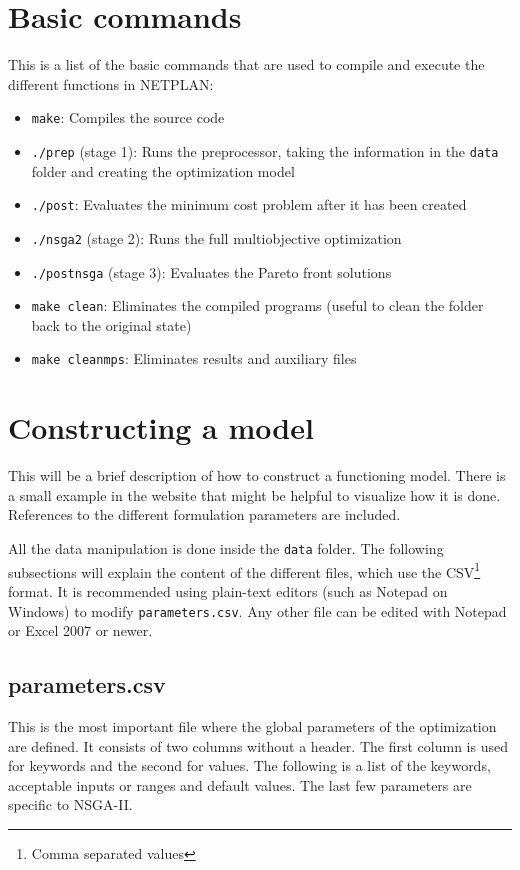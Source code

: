 \documentclass{article}
\begin{document}
\section{Basic commands}

This is a list of the basic commands that are used to compile and execute the different functions in NETPLAN:

\begin{itemize}
  \item \verb=make=: Compiles the source code
  \item \verb=./prep= (stage 1): Runs the preprocessor, taking the information in the \verb=data= folder and creating the optimization model
  \item \verb=./post=: Evaluates the minimum cost problem after it has been created
  \item \verb=./nsga2= (stage 2): Runs the full multiobjective optimization
  \item \verb=./postnsga= (stage 3): Evaluates the Pareto front solutions
  \item \verb=make clean=: Eliminates the compiled programs (useful to clean the folder back to the original state)
  \item \verb=make cleanmps=: Eliminates results and auxiliary files
\end{itemize}


\section{Constructing a model}

This will be a brief description of how to construct a functioning model. There is a small example in the website that might be helpful to visualize how it is done. References to the different formulation parameters are included.

All the data manipulation is done inside the \verb=data= folder. The following subsections will explain the content of the different files, which use the CSV\footnote{Comma separated values} format. It is recommended using plain-text editors (such as Notepad on Windows) to modify \verb=parameters.csv=. Any other file can be edited with Notepad or Excel 2007 or newer.


\subsection{parameters.csv}

This is the most important file where the global parameters of the optimization are defined. It consists of two columns without a header. The first column is used for keywords and the second for values. The following is a list of the keywords, acceptable inputs or ranges and default values. The last few parameters are specific to NSGA-II.
\end{document}
